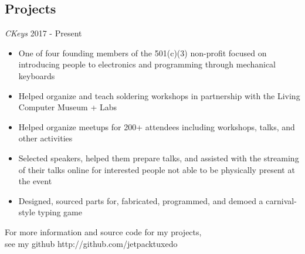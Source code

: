 \documentclass[line,margin]{res}
\newenvironment{tightcenter}{%
  \setlength\topsep{0pt}
  \setlength\parskip{0pt}
  \begin{center}
  }{\end{center}}
\begin{document}
\begin{resume}
  \section{\textcolor{TealBlue}{Projects}}
    {\sl CKeys} \hfill 2017 - Present
      \begin{itemize}  \itemsep -2pt %
        \item One of four founding members of the 501(c)(3) non-profit focused on introducing people to electronics and programming through mechanical keyboards
        \item Helped organize and teach soldering workshops in partnership with the Living Computer Museum + Labs
        \item Helped organize meetups for 200+ attendees including workshops, talks, and other activities
        \item Selected speakers, helped them prepare talks, and assisted with the streaming of their talks online for interested people not able to be physically present at the event
        \item Designed, sourced parts for, fabricated, programmed, and demoed a carnival-style typing game
    \end{itemize}

\end{resume}

\vfill
\begin{tightcenter}
For more information and source code for my projects,\\
see my github http://github.com/jetpacktuxedo
\end{tightcenter}
\end{document}
